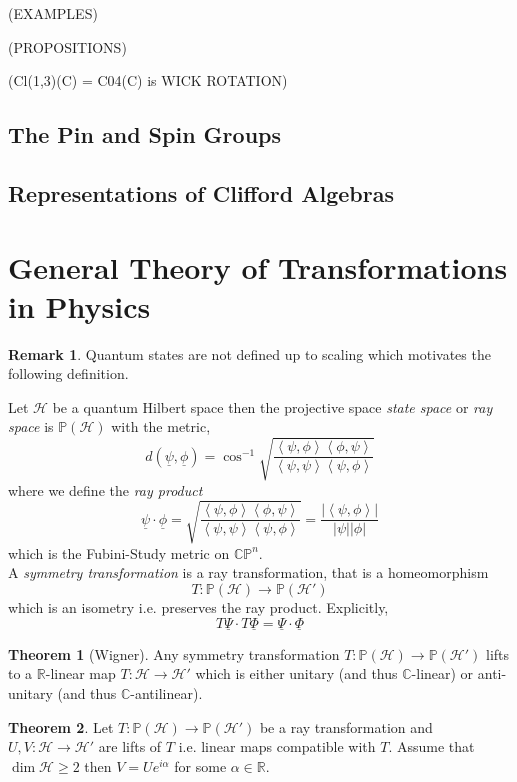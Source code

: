 \documentclass[12pt]{extarticle}
\newcommand{\R}{\mathbb{R}}
\theoremstyle{definition}
\newtheorem{theorem}{Theorem}[section]
\newtheorem{remark}{Remark}
\newenvironment{definition}[1][Definition:]{\begin{trivlist}
\item[\hskip \labelsep {\bfseries #1}]}{\end{trivlist}}
\newcommand{\C}{\mathbb{C}}
\newcommand{\Hil}{\mathcal{H}}
\newcommand{\inner}[2]{\left< #1, #2 \right>}
\renewcommand{\P}{\mathbb{P}}
\newcommand{\CP}{\mathbb{CP}}
\begin{document}
(EXAMPLES)

(PROPOSITIONS)

(Cl(1,3)(C) = C04(C) is WICK ROTATION)

\subsection{The Pin and Spin Groups}

\subsection{Representations of Clifford Algebras}

\section{General Theory of Transformations in Physics}

\begin{remark}
Quantum states are not defined up to scaling which motivates the following definition.
\end{remark}

\begin{definition}
Let $\Hil$ be a quantum Hilbert space then the projective space \textit{state space} or \textit{ray space} is $\P(\Hil)$ with the metric,
\[ d(\underline{\psi}, \underline{\phi}) = \cos^{-1}{\sqrt{\frac{\inner{\psi}{\phi} \inner{\phi}{\psi}}{\inner{\psi}{\psi} \inner{\psi}{\phi}}}} \]
where we define the \textit{ray product}
\[ \underline{\psi} \cdot  \underline{\phi} = \sqrt{\frac{\inner{\psi}{\phi} \inner{\phi}{\psi}}{\inner{\psi}{\psi} \inner{\psi}{\phi}}} = \frac{| \inner{\psi}{\phi} |}{|\psi| |\phi|} \]
which is the Fubini-Study metric on $\CP^n$. 
\bigskip\\
A \textit{symmetry transformation} is a ray transformation, that is a homeomorphism \[ T : \P(\Hil) \to \P(\Hil') \]
which is an isometry i.e. preserves the ray product. Explicitly,
\[ T \underline{\Psi} \cdot T \underline{\Phi} = \underline{\Psi} \cdot \underline{\Phi} \]
\end{definition}

\begin{theorem}[Wigner]
Any symmetry transformation $T : \P(\Hil) \to \P(\Hil')$ lifts to a $\R$-linear map $T : \Hil \to \Hil'$ which is either unitary (and thus $\C$-linear) or anti-unitary (and thus $\C$-antilinear). 
\end{theorem}

\begin{theorem}
Let $T : \P(\Hil) \to \P(\Hil')$ be a ray transformation and $U, V : \Hil \to \Hil'$ are lifts of $T$ i.e. linear maps compatible with $T$. Assume that $\dim{\Hil} \ge 2$ then $V = U e^{i \alpha}$ for some $\alpha \in \R$. 
\end{theorem}
\end{document}
